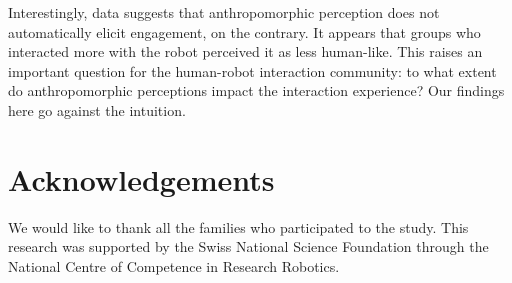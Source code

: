 \documentclass[letterpaper, 10pt, conference]{ieeeconf}
\begin{document}
Interestingly, data suggests that anthropomorphic perception does not
automatically elicit  engagement, on the contrary. It appears that groups who
interacted more with the robot perceived it as less human-like. This raises an
important question for the human-robot interaction community: to what extent do
anthropomorphic perceptions impact the interaction experience? Our findings here
go against the intuition.


\section*{Acknowledgements}

We would like to thank all the families who participated to the study.
This research was supported by the Swiss National Science Foundation through the
National Centre of Competence in Research Robotics.



\end{document}
